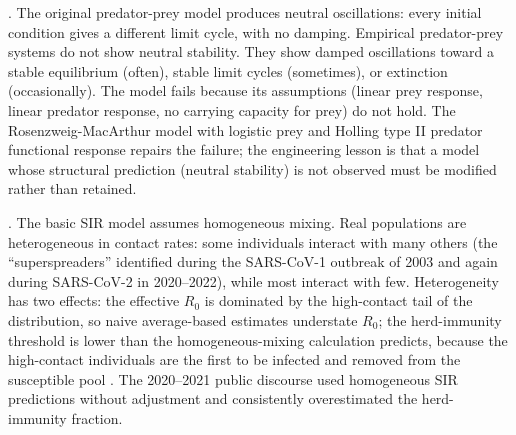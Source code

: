 . The
original predator-prey model produces neutral oscillations: every
initial condition gives a different limit cycle, with no damping.
Empirical predator-prey systems do not show neutral stability. They
show damped oscillations toward a stable equilibrium (often), stable
limit cycles (sometimes), or extinction (occasionally). The model
fails because its assumptions (linear prey response, linear predator
response, no carrying capacity for prey) do not hold. The
Rosenzweig-MacArthur model with logistic prey and Holling type II
predator functional response repairs the failure; the engineering
lesson is that a model whose structural prediction (neutral
stability) is not observed must be modified rather than retained.

. The basic SIR model
assumes homogeneous mixing. Real populations are heterogeneous in
contact rates: some individuals interact with many others (the
``superspreaders'' identified during the SARS-CoV-1 outbreak of
2003 and again during SARS-CoV-2 in 2020--2022), while most
interact with few. Heterogeneity has two effects: the effective
$R_0$ is dominated by the high-contact tail of the distribution, so
naive average-based estimates understate $R_0$; the herd-immunity
threshold is lower than the homogeneous-mixing calculation predicts,
because the high-contact individuals are the first to be infected
and removed from the susceptible pool
\cite[Tab.~2]{paper:v6c08-lloyd-smith-2005-superspreaders}. The 2020--2021
public discourse used homogeneous SIR predictions without
adjustment and consistently overestimated the herd-immunity
fraction.





